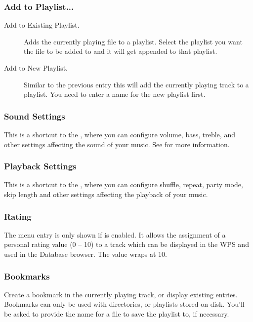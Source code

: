 \subsubsection{Add to Playlist...}
  \begin{description}
    \item [Add to Existing Playlist.] Adds the currently playing file to a playlist.
    Select the playlist you want the file to be added to and it will get
    appended to that playlist.
    \item [Add to New Playlist.] Similar to the previous entry this will
    add the currently playing track to a playlist. You need to enter a name
    for the new playlist first.
  \end{description}

\subsubsection{Sound Settings}
This is a shortcut to the , where you can configure volume,
bass, treble, and other settings affecting the sound of your music.
See  for more information.

\subsubsection{Playback Settings}
This is a shortcut to the , where you can configure shuffle,
repeat, party mode, skip length and other settings affecting the playback of your music.

\subsubsection{Rating}
The menu entry is only shown if  is
enabled. It allows the assignment of a personal rating value (0 -- 10)
to a track which can be displayed in the WPS and used in the Database
browser. The value wraps at 10.

\subsubsection{\label{ref:createbookmark}Bookmarks}
Create a bookmark in the currently playing track, or display existing entries.
Bookmarks can only be used with directories, or playlists stored on
disk. You'll be asked to provide the name for a file to save the playlist to,
if necessary.

